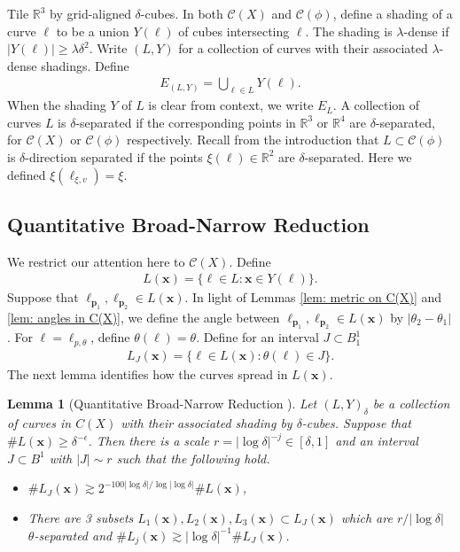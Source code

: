 \documentclass[12pt]{amsart}
\newcommand{\x}{{\bf{x}}}
\numberwithin{equation}{section}
\newtheorem{lemma}{Lemma}[section]
\newcommand{\cC}{\mathcal C}
\renewcommand{\cC}{{\mathcal C}}
\newcommand{\R}{\mathbb{R}}
\newcommand{\1}{\mathbbm{1}}
\newcommand{\p}{\mathbf p}
\renewcommand{\x}{\mathbf x}
\begin{document}
Tile $\R^3$ by grid-aligned $\delta$-cubes. 
In both $\cC(X)$ and $\cC(\phi)$, define a shading of a curve $\ell$ to be a union $Y(\ell)$ of cubes intersecting $\ell$. The shading is $\lambda$-dense if $|Y(\ell)| \geq \lambda \delta^2$. 
Write $(L,Y)$ for a collection of curves with their associated $\lambda$-dense shadings. Define 
\begin{align}
    E_{(L,Y)} = \bigcup_{\ell \in L} Y(\ell). 
\end{align}
When the shading $Y$ of $L$ is clear from context, we write $E_L$. A collection of curves $L$ is $\delta$-separated if the corresponding points in $\R^3$ or $\R^4$ are $\delta$-separated, for $\cC(X)$ or $\cC(\phi)$ respectively. Recall from the introduction that $L \subset \cC(\phi)$ is $\delta$-direction separated if the points $\xi(\ell) \in \R^2$ are $\delta$-separated. Here we defined $\xi(\ell_{\xi,v}) = \xi$.

\subsection{Quantitative Broad-Narrow Reduction}
We restrict our attention here to $\cC(X)$. Define 
\begin{align}
    L(\x) = \{\ell \in L : \x \in Y(\ell)\}.
\end{align}
Suppose that $\ell_{\p_1}, \ell_{\p_2} \in L(\x)$. In light of Lemmas \ref{lem: metric on C(X)} and \ref{lem: angles in C(X)}, we define the angle between $\ell_{\p_1}, \ell_{\p_2} \in L(\x)$ by $|\theta_2 - \theta_1|$. For $\ell = \ell_{p,\theta}$, define $\theta(\ell) = \theta$. Define for an interval $J \subset B_1^1$ 
\begin{align}
    L_J(\x) = \{\ell \in L(\x) : \theta(\ell) \in J\}. 
\end{align}
The next lemma identifies how the curves spread in $L(\x)$. 
\begin{lemma}[Quantitative Broad-Narrow Reduction ]\label{lem: broad narrow}
    Let $(L,Y)_\delta$ be a collection of curves in $C(X)$ with their associated shading by $\delta$-cubes. Suppose that $\# L(\x) \geq \delta^{-\epsilon}$. 
    Then there is a scale $r = |\log \delta|^{-j} \in [\delta, 1]$ and an interval $J \subset B^1$ with $|J| \sim r$ such that the following hold. 
    \begin{itemize}
        \item $\# L_J(\x) \gtrsim 2^{-100 |\log \delta| / \log |\log \delta|} \#L(\x)$,
        \item There are 3 subsets $L_1(\x), L_2(\x), L_3(\x) \subset L_J(\x)$ which are $r/|\log \delta|$ $\theta$-separated and $\# L_j(\x) \gtrsim |\log \delta|^{-1} \# L_J(\x)$. 
    \end{itemize}
\end{lemma}
\end{document}
